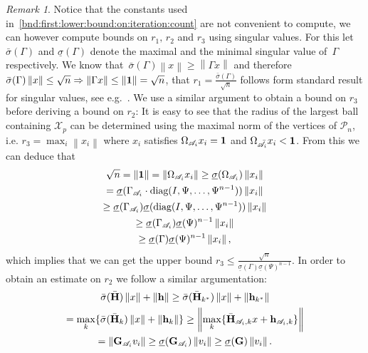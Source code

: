 \documentclass[journal]{IEEEtran}
\providecommand{\norm}[1]{\left\|#1\right\|}
\newcounter{thmcount}
\theoremstyle{remark}
\newtheorem{rem}[thmcount]{Remark}
\theoremstyle{definition}
\begin{document}
\begin{rem}
Notice that the constants used in~\eqref{bnd:first:lower:bound:on:iteration:count} are not
convenient to compute, we can however compute bounds on $r_1,\, r_2$ and $r_3$ using 
singular values.
%
For this let $\bar\sigma(\Gamma)$ and $\underline\sigma(\Gamma)$ denote the maximal and the minimal
singular value of~$\Gamma$ respectively.
%
We know that~$\bar\sigma(\Gamma)\norm{x}\geq\norm{\Gamma x}$ and therefore $\bar\sigma(\Gamma)\norm{x}
\leq \sqrt{n}\Rightarrow \norm{\Gamma x}\leq\norm{\bf{1}}=\sqrt{n}$, that $r_1=\frac{\bar\sigma(\Gamma)}{\sqrt{n}}$
follows form standard result for singular values, see e.g.~\cite{Golub:1996}.
%
We use a similar argument to obtain a bound on $r_3$ before deriving a bound on $r_2$:
%
It is easy to see that the radius of the largest ball containing $\mathcal X_p$ can be determined using the maximal
norm of the vertices of $\mathcal P_n$, i.e. $r_3=\max_{i}\norm{x_i}$ where $x_i$ satisfies $\Omega_{\mathscr{A}_i} x_i={\bf{1}}$
and $\Omega_{\bar{\mathscr A}_i}x_i<{\bf{1}}$.
%
From this we can deduce that
%
\begin{multline}
  \sqrt{n}=\norm{\bf{1}}=\norm{\Omega_{\mathscr{A}_i}x_i}\geq\underline\sigma(\Omega_{\mathscr{A}_i})\norm{x_i}\\
  =\underline\sigma(\Gamma_{\mathscr{A}_i}\cdot \text{diag}(I,\Psi,\dots,\Psi^{n-1}))\norm{x_i}\\
  \geq\underline\sigma(\Gamma_{\mathscr{A}_i})\underline\sigma( \text{diag}(I,\Psi,\dots,\Psi^{n-1}))\norm{x_i}\\
  \geq\underline\sigma(\Gamma_{\mathscr{A}_i})\underline\sigma(\Psi)^{n-1}\norm{x_i}\\
  \geq\underline\sigma(\Gamma)\underline\sigma(\Psi)^{n-1}\norm{x_i},
\end{multline}
%
which implies that we can get the upper bound $r_3\leq\frac{\sqrt{n}}{\underline\sigma(\Gamma)
\underline\sigma(\Psi)^{n-1}}$.
%
In order to obtain an estimate on $r_2$ we follow a similar argumentation:
%
\begin{multline}
  \bar\sigma(\bar{\bf{H}})\norm{x}+\norm{{\bf{h}}}
  \geq\bar\sigma(\bar{\bf{H}}_{k^\ast})\norm{x}+\norm{{\bf{h}}_{k^\ast}}\\
  =\max_k\{\bar\sigma(\bar{\bf{H}}_k)\norm{x}+\norm{{\bf{h}}_k}\}
  \geq\norm{\max_k\{\bar{\bf{H}}_{\mathscr{A}_i,k} x + {\bf{h}}_{{\mathscr{A}_i},k}\}}\\ 
  =\norm{{\bf{G}}_{\mathscr{A}_i}v_i} \geq\underline\sigma({\bf{G}}_{\mathscr A_i})\norm{v_i}
  \geq\underline\sigma({\bf{G}})\norm{v_i}.

\end{multline}
\end{rem}
\end{document}
